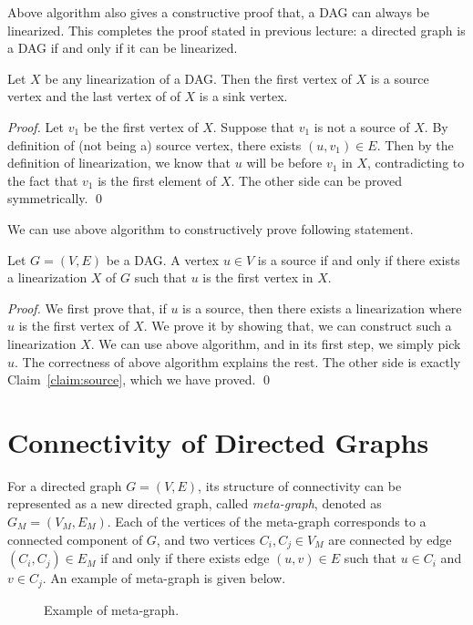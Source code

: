 Above algorithm also gives a constructive proof that, a DAG can always
be linearized. This completes the proof stated in previous lecture: a directed graph is a DAG if and only if it can be linearized.

\begin{claim}
Let $X$ be any linearization of a DAG. Then the first vertex of $X$ is a source vertex and 
the last vertex of of $X$ is a sink vertex.
\label{claim:source}
\end{claim}

\emph{Proof.} Let $v_1$ be the first vertex of $X$. Suppose that $v_1$ is not a source of $X$. 
By definition of (not being a) source vertex, there exists $(u,v_1)\in E$. Then by the definition
of linearization, we know that $u$ will be before $v_1$ in $X$, contradicting to the fact that
$v_1$ is the first element of $X$.
The other side can be proved symmetrically. \qed

We can use above algorithm to constructively prove following statement.

\begin{claim}
Let $G = (V, E)$ be a DAG. A vertex $u\in V$ is a source if and only if 
there exists a linearization $X$ of $G$ such that $u$ is the first vertex in $X$.
\end{claim}

\emph{Proof.} We first prove that, if $u$ is a source, then there exists a linearization
where $u$ is the first vertex of $X$. We prove it by showing that,
we can construct such a linearization $X$. We can use above algorithm,
and in its first step, we simply pick $u$. The correctness of above algorithm
explains the rest.  The other side is exactly Claim~\ref{claim:source}, which we have proved. \qed

\section*{Connectivity of Directed Graphs}

For a directed graph $G = (V,E)$, its structure of connectivity can be represented as a new
directed graph, called \emph{meta-graph}, denoted as $G_M = (V_M, E_M)$.
Each of the vertices of the meta-graph corresponds to a connected component of $G$,
and two vertices $C_i, C_j  \in V_M$ are connected by edge $(C_i, C_j) \in E_M$
if and only if there exists edge $(u,v)\in E$ such that $u\in C_i$ and $v\in C_j$.
An example of meta-graph is given below.

\begin{figure}[h!]
\centering{}
\caption{Example of meta-graph.}
\label{fig:meta-graph}
\end{figure}

